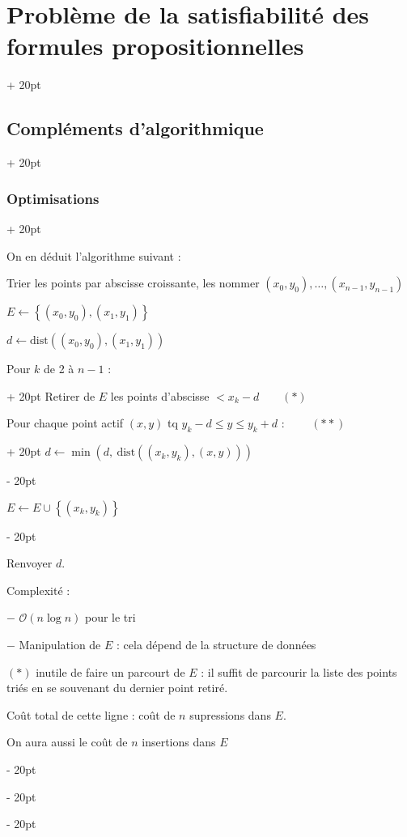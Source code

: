 \documentclass[a4paper, 12pt, twoside]{article}
\newcommand{\set}[1]{\left\{ #1 \right\}}
\renewcommand{\le}{\leqslant}
\newcommand{\ind}[1][20pt]{\advance\leftskip + #1}
\newcommand{\deind}[1][20pt]{\advance\leftskip - #1}
\newenvironment{indt}[2][20pt]{#2 \par \ind[#1]}{\par \deind} %
\begin{document}
\begin{indt}{\section{Problème de la satisfiabilité des formules propositionnelles}}
\begin{indt}{\subsection{Compléments d'algorithmique}}
\begin{indt}{\subsubsection{Optimisations}}
                \vspace{12pt}
                
                On en déduit l'algorithme suivant :
                
                \begin{pseudocode}
                    Trier les points par abscisse croissante, les nommer
                    $(x_0, y_0), \ldots, (x_{n - 1}, y_{n - 1})$
                    
                    $E \leftarrow \set{(x_0, y_0), (x_1, y_1)}$
                    
                    $d \leftarrow \mathrm{dist}((x_0, y_0), (x_1, y_1))$
                    
                    \begin{indt}{Pour $k$ de 2 à $n - 1$ :}
                        Retirer de $E$ les points d'abscisse $< x_k - d\qquad (*)$
                        
                        \begin{indt}{Pour chaque point actif $(x, y)$ tq $y_k - d \le y \le y_k + d$ : $\qquad (**)$}
                            $d \leftarrow \min(d,\ \mathrm{dist}((x_k, y_k), (x, y)))$
                        \end{indt}
                        
                        $E \leftarrow E \cup \set{(x_k, y_k)}$
                    \end{indt}
                    
                    Renvoyer $d$.
                \end{pseudocode}
                
                Complexité :
                
                $-$ $\mathcal O(n \log n)$ pour le tri
                
                $-$ Manipulation de $E$ : cela dépend de la structure de données
                
                $(*)$ inutile de faire un parcourt de $E$ : il suffit de parcourir la liste des points triés en se souvenant du dernier point retiré.
                
                Coût total de cette ligne : coût de $n$ supressions dans $E$.
                
                On aura aussi le coût de $n$ insertions dans $E$
                
                \vspace{12pt}
                

\end{indt}
\end{indt}
\end{indt}
\end{document}
